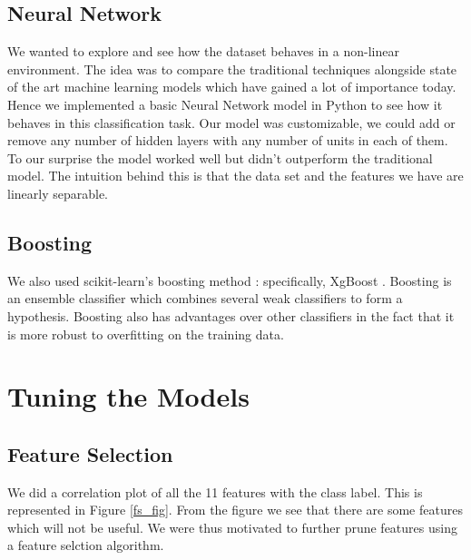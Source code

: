 \documentclass[conference]{IEEEtran}
\numberwithin{equation}{section}
\numberwithin{figure}{section}
\numberwithin{table}{section}
\begin{document}
\subsection{Neural Network}\label{sec:colour-illustrations}
We wanted to explore and see how the dataset behaves in a non-linear environment. The idea was to compare the traditional techniques alongside state of the art machine learning models which have gained a lot of importance today. Hence we implemented a basic Neural Network model in Python to see how it behaves in this classification task. Our model was customizable, we could add or remove any number of hidden layers with any number of units in each of them. To our surprise the model worked well but didn't outperform the traditional model. The intuition behind this is that the data set and the features we have are linearly separable. 

\subsection{Boosting}
We also used scikit-learn's boosting method : specifically, XgBoost \cite{xgboost}. Boosting is an ensemble classifier which combines several weak classifiers to form a hypothesis. Boosting also has advantages over other classifiers in the fact that it is more robust to overfitting on the training data. 

\section{Tuning the Models}
\subsection{Feature Selection}
We did a correlation plot of all the 11 features with the class label. 
This is represented in Figure \ref{fs_fig}. From the figure we see that there are some features which will not be useful. We were thus motivated to further prune features using a feature selction algorithm.
\end{document}
